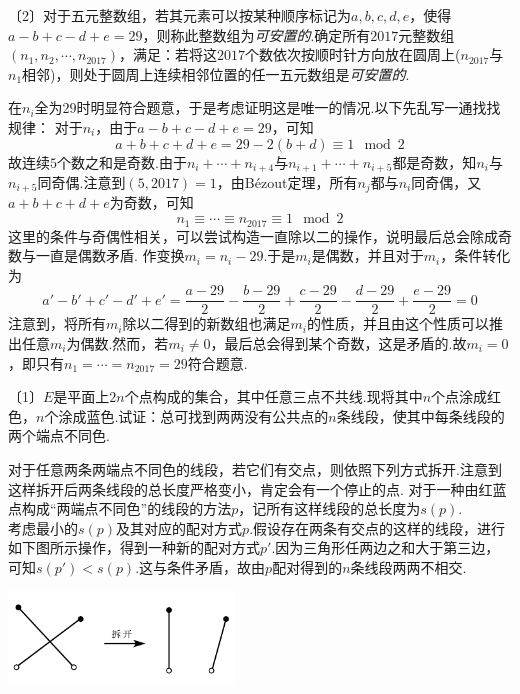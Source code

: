 \documentclass[cn,hazy,black,10pt,normal]{elegantnote}
\newenvironment{guess}{
  \color{guess}}{\newline \color{black}}
\newcommand{\nd}[1]{〔#1〕}
\begin{document}
\begin{problem} %
	\nd{2}对于五元整数组，若其元素可以按某种顺序标记为$a,b,c,d,e$，使得$a-b+c-d+e=29$，则称此整数组为\textit{可安置的}.确定所有$2017$元整数组$(n_1,n_2, \cdots ,n_{2017})$，满足：若将这$2017$个数依次按顺时针方向放在圆周上($n_{2017}$与$n_1$相邻)，则处于圆周上连续相邻位置的任一五元数组是\textit{可安置的}.
\end{problem}
\begin{solution}
	\begin{guess}
		在$n_i$全为$29$时明显符合题意，于是考虑证明这是唯一的情况.以下先乱写一通找找规律：
	\end{guess}
	对于$n_i$，由于$a-b+c-d+e=29$，可知$$a+b+c+d+e=29-2(b+d) \equiv 1\mod 2$$
	故连续$5$个数之和是奇数.由于$n_i+ \cdots + n_{i+4}$与$n_{i+1} + \cdots + n_{i+5}$都是奇数，知$n_i$与$n_{i+5}$同奇偶.注意到$(5,2017)=1$，由Bézout定理，所有$n_j$都与$n_i$同奇偶，又$a+b+c+d+e$为奇数，可知$$n_1 \equiv \cdots \equiv n_{2017} \equiv 1 \mod 2$$
	\begin{guess}
		这里的条件与奇偶性相关，可以尝试构造一直除以二的操作，说明最后总会除成奇数与一直是偶数矛盾.
	\end{guess}
	作变换$m_i=n_i-29$.于是$m_i$是偶数，并且对于$m_i$，条件转化为$$a' - b' + c' - d' + e' = \frac{a-29}{2} - \frac{b-29}{2} + \frac{c-29}{2} - \frac{d-29}{2} + \frac{e-29}{2} = 0$$
	注意到，将所有$m_i$除以二得到的新数组也满足$m_i$的性质，并且由这个性质可以推出任意$m_i$为偶数.然而，若$m_i \neq 0$，最后总会得到某个奇数，这是矛盾的.故$m_i=0$，即只有$n_1 = \cdots = n_{2017}=29$符合题意.
\end{solution}

\begin{problem} %
	\nd{1}$E$是平面上$2n$个点构成的集合，其中任意三点不共线.现将其中$n$个点涂成红色，$n$个涂成蓝色.试证：总可找到两两没有公共点的$n$条线段，使其中每条线段的两个端点不同色.
\end{problem}
\begin{solution}
	\begin{guess}
		对于任意两条两端点不同色的线段，若它们有交点，则依照下列方式拆开.注意到这样拆开后两条线段的总长度严格变小，肯定会有一个停止的点.
	\end{guess}
	对于一种由红蓝点构成“两端点不同色”的线段的方法$p$，记所有这样线段的总长度为$s(p)$. \\
	考虑最小的$s(p)$及其对应的配对方式$p$.假设存在两条有交点的这样的线段，进行如下图所示操作，得到一种新的配对方式$p'$.因为三角形任两边之和大于第三边，可知$s(p')<s(p)$.这与条件矛盾，故由$p$配对得到的$n$条线段两两不相交.
	\begin{center}
		\includegraphics[width=6cm]{attachment/202302072.pdf}
	\end{center}
\end{solution}
\end{document}
